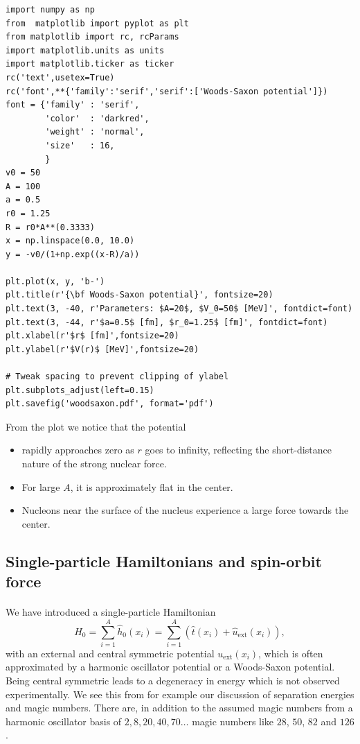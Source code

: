 \documentclass[%
twoside,                 %
final,                   %
10pt]{article}
\begin{document}
\begin{verbatim}
import numpy as np
from  matplotlib import pyplot as plt
from matplotlib import rc, rcParams
import matplotlib.units as units
import matplotlib.ticker as ticker
rc('text',usetex=True)
rc('font',**{'family':'serif','serif':['Woods-Saxon potential']})
font = {'family' : 'serif',
        'color'  : 'darkred',
        'weight' : 'normal',
        'size'   : 16,
        }
v0 = 50
A = 100
a = 0.5
r0 = 1.25
R = r0*A**(0.3333)
x = np.linspace(0.0, 10.0)
y = -v0/(1+np.exp((x-R)/a))

plt.plot(x, y, 'b-')
plt.title(r'{\bf Woods-Saxon potential}', fontsize=20)     
plt.text(3, -40, r'Parameters: $A=20$, $V_0=50$ [MeV]', fontdict=font)
plt.text(3, -44, r'$a=0.5$ [fm], $r_0=1.25$ [fm]', fontdict=font)
plt.xlabel(r'$r$ [fm]',fontsize=20)
plt.ylabel(r'$V(r)$ [MeV]',fontsize=20)

# Tweak spacing to prevent clipping of ylabel
plt.subplots_adjust(left=0.15)
plt.savefig('woodsaxon.pdf', format='pdf')
\end{verbatim}
From the plot we notice that the potential
\begin{itemize}
\item rapidly approaches zero as $r$ goes to infinity, reflecting the short-distance nature of the strong nuclear force.

\item For large $A$, it is approximately flat in the center.

\item Nucleons near the surface of the nucleus experience a large force towards the center.
\end{itemize}

\noindent






\subsection*{Single-particle Hamiltonians and spin-orbit force}

\paragraph{}
We have introduced a single-particle Hamiltonian
\[
  H_0=\sum_{i=1}^A \hat{h}_0(x_i) =  \sum_{i=1}^A\left(\hat{t}(x_i) + \hat{u}_{\mathrm{ext}}(x_i)\right),
\]
with an external and central symmetric potential $u_{\mathrm{ext}}(x_i)$, which is often 
approximated by a harmonic oscillator potential or a Woods-Saxon potential. Being central symmetric leads to a degeneracy 
in energy which is not observed experimentally. We see this from for example our discussion of separation energies and magic numbers. There are, in addition to the assumed magic numbers from a harmonic oscillator basis of $2,8,20,40,70\dots$ magic numbers like $28$, $50$, $82$ and $126$. 
\end{document}
